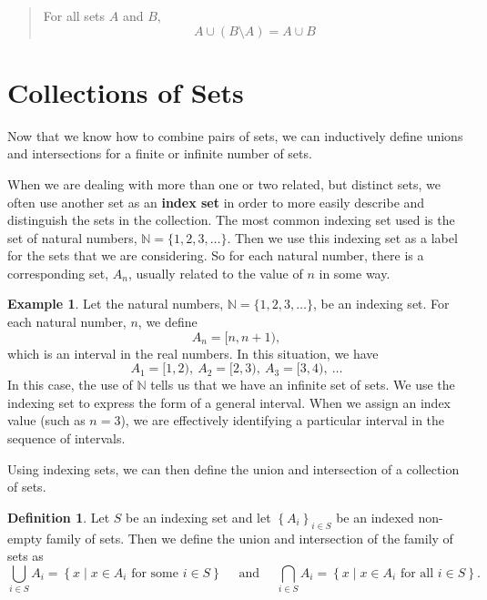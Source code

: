 \documentclass[
]{book}
\theoremstyle{definition}
\newtheorem{definition}{Definition}[chapter]
\theoremstyle{definition}
\newtheorem{example}{Example}[chapter]
\theoremstyle{definition}
\theoremstyle{definition}
\theoremstyle{remark}
\begin{document}
\begin{quote}
For all sets \(A\) and \(B\), \[A \cup (B\setminus A)= A \cup B\]
\end{quote}

\hypertarget{collections-of-sets}{%
\section{Collections of Sets}\label{collections-of-sets}}

Now that we know how to combine pairs of sets, we can inductively define unions and intersections for a finite or infinite number of sets.

When we are dealing with more than one or two related, but distinct sets, we often use another set as an \textbf{index set} in order to more easily describe and distinguish the sets in the collection. The most common indexing set used is the set of natural numbers, \(\mathbb{N}=\{1, 2, 3, \ldots \}\). Then we use this indexing set as a label for the sets that we are considering. So for each natural number, there is a corresponding set, \(A_n\), usually related to the value of \(n\) in some way.

\begin{example}
Let the natural numbers, \(\mathbb{N}=\{1, 2, 3, \ldots \}\), be an indexing set. For each natural number, \(n\), we define \[A_n = [n,n+1),\] which is an interval in the real numbers. In this situation, we have
\[A_1 = [1,2), \:  A_2 = [2,3), \: A_3 = [3,4),\:  \ldots \]
In this case, the use of \(\mathbb{N}\) tells us that we have an infinite set of sets. We use the indexing set to express the form of a general interval. When we assign an index value (such as \(n=3\)), we are effectively identifying a particular interval in the sequence of intervals.
\end{example}

Using indexing sets, we can then define the union and intersection of a collection of sets.

\begin{definition}
\protect\hypertarget{def:set-indexing}{}\label{def:set-indexing}Let \(S\) be an indexing set and let \(\left\{ A_i\right\}_{i\in S}\) be an indexed non-empty family of sets. Then we define the union and intersection of the family of sets as
\[\bigcup_{i\in S} A_i = \left\{ x \middle \vert x\in A_i \mbox{ for some } i\in S\right\} \quad \mbox{ and } \quad \bigcap_{i\in S} A_i = \left\{ x\middle \vert x\in A_i \mbox{ for all } i \in S\right\}.\]
\end{definition}
\end{document}
